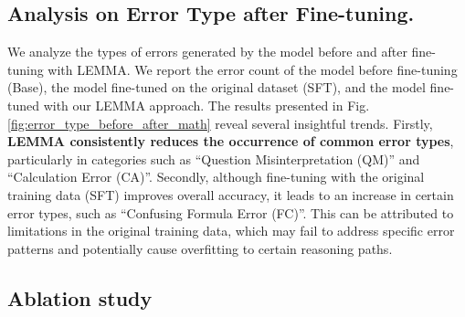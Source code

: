 \documentclass[11pt]{article}
\begin{document}
\subsection{Analysis on Error Type after Fine-tuning.}

\noindent We analyze the types of errors generated by the model before and after fine-tuning with LEMMA. We report the error count of the model before fine-tuning (Base), the model fine-tuned on the original dataset (SFT), and the model fine-tuned with our LEMMA approach.
The results presented in Fig.\ref{fig:error_type_before_after_math} reveal several insightful trends. Firstly, \textbf{LEMMA consistently reduces the occurrence of common error types}, particularly in categories such as ``Question Misinterpretation (QM)'' and ``Calculation Error (CA)''. Secondly, although fine-tuning with the original training data (SFT) improves overall accuracy, it leads to an increase in certain error types, such as ``Confusing Formula Error (FC)''. This can be attributed to limitations in the original training data, which may fail to address specific error patterns and potentially cause overfitting to certain reasoning paths. 

\subsection{Ablation study}

\end{document}
